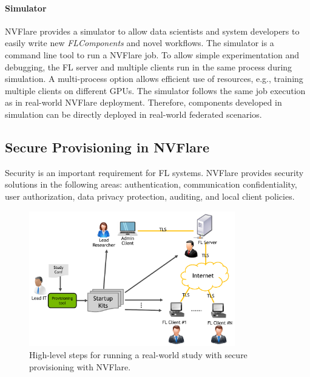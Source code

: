 \documentclass[11pt]{article}
\begin{document}
\paragraph{Simulator} NVFlare provides a simulator to allow data scientists and system developers to easily write new \textit{FLComponents} and novel workflows.
The simulator is a command line tool to run a NVFlare job. To allow simple experimentation and debugging, the FL server and multiple clients run in the same process during simulation. A multi-process option allows efficient use of resources, e.g., training multiple clients on different GPUs. The simulator follows the same job execution as in real-world NVFlare deployment. Therefore, components developed in simulation can be directly deployed in real-world federated scenarios.

\subsection{Secure Provisioning in NVFlare}
Security is an important requirement for FL systems. NVFlare provides security solutions in the following areas: authentication, communication confidentiality, user authorization, data privacy protection, auditing, and local client policies.
\begin{figure}[tbp]
    \centering
    \includegraphics[width=0.8\textwidth]{submissions/HolgerRoth/fig/provisioning.pdf}
    \caption{High-level steps for running a real-world study with secure provisioning with NVFlare. \label{fig:provisioning}}
\end{figure}
\end{document}
